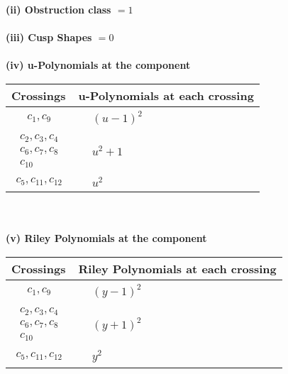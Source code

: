 \documentclass[1p]{elsarticle_modified}
\theoremstyle{definition}
\begin{document}
\flushleft \textbf{(ii) Obstruction class $= 1$}\\~\\
\flushleft \textbf{(iii) Cusp Shapes $= 0$}\\~\\
\newpage\renewcommand{\arraystretch}{1}
\flushleft \textbf{(iv) u-Polynomials at the component}\newline \\
\begin{tabular}{m{50pt}|m{274pt}}
Crossings & \hspace{64pt}u-Polynomials at each crossing \\
\hline $$\begin{aligned}c_{1},c_{9}\end{aligned}$$&$\begin{aligned}
&(u-1)^2
\end{aligned}$\\
\hline $$\begin{aligned}c_{2},c_{3},c_{4}\\c_{6},c_{7},c_{8}\\c_{10}\end{aligned}$$&$\begin{aligned}
&u^2+1
\end{aligned}$\\
\hline $$\begin{aligned}c_{5},c_{11},c_{12}\end{aligned}$$&$\begin{aligned}
&u^2
\end{aligned}$\\
\hline
\end{tabular}\\~\\
\newpage\renewcommand{\arraystretch}{1}
\flushleft \textbf{(v) Riley Polynomials at the component}\newline \\
\begin{tabular}{m{50pt}|m{274pt}}
Crossings & \hspace{64pt}Riley Polynomials at each crossing \\
\hline $$\begin{aligned}c_{1},c_{9}\end{aligned}$$&$\begin{aligned}
&(y-1)^2
\end{aligned}$\\
\hline $$\begin{aligned}c_{2},c_{3},c_{4}\\c_{6},c_{7},c_{8}\\c_{10}\end{aligned}$$&$\begin{aligned}
&(y+1)^2
\end{aligned}$\\
\hline $$\begin{aligned}c_{5},c_{11},c_{12}\end{aligned}$$&$\begin{aligned}
&y^2
\end{aligned}$\\
\hline
\end{tabular}\\~\\
\end{document}
